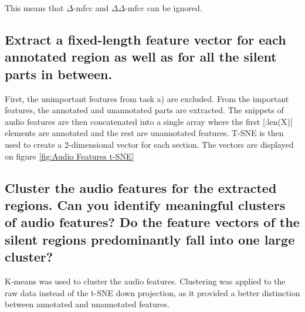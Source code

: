 This means that $\Delta$-mfcc and $\Delta\Delta$-mfcc can be ignored.

\subsection{Extract a fixed-length feature vector for each annotated region as well as for all the silent parts in between. }
\label{sec:Audio Features:b}

First, the unimportant features from task a) are excluded. From the important features, the annotated and unannotated parts are extracted.
The snippets of audio features are then concatenated into a single array where the first [:len(X)] elements are annotated and the rest are unannotated features. T-SNE is then used to create a 2-dimensional vector for each section. The vectors are displayed on figure \ref{fig:Audio Features t-SNE} 


\subsection{Cluster the audio features for the extracted regions. Can you identify meaningful clusters of audio features? Do the feature vectors of the silent regions predominantly fall into one large cluster?}
\label{sec:Audio Feature Clusters}

K-means was used to cluster the audio features. Clustering was applied to the raw data instead of the t-SNE down projection, as it provided a better distinction between annotated and unannotated features.


